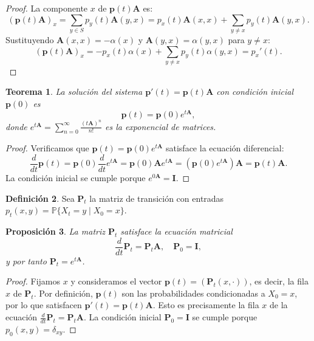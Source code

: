 \documentclass{article}
\theoremstyle{plain}
\newtheorem{Teorema}{Teorema}[section]
\newtheorem{Proposicion}[Teorema]{Proposici\'on}
\theoremstyle{definition}
\newtheorem{Definicion}[Teorema]{Definici\'on}
\newcommand{\Prob}{\mathbb{P}}
\newcommand{\A}{\mathbf{A}}
\newcommand{\I}{\mathbf{I}}
\newcommand{\p}{\mathbf{p}}
\newcommand{\PP}{\mathbf{P}}
\begin{document}
\begin{proof}
  La componente $x$ de $\p(t)\A$ es:
  \[ (\p(t)\A)_x = \sum_{y \in S} p_y(t) \A(y,x) = p_x(t)\A(x,x) + \sum_{y \neq x} p_y(t) \A(y,x). \]
  Sustituyendo $\A(x,x) = -\alpha(x)$ y $\A(y,x) = \alpha(y,x)$ para $y \neq x$:
  \[ (\p(t)\A)_x = -p_x(t)\alpha(x) + \sum_{y \neq x} p_y(t)\alpha(y,x) = p_x'(t). \]
\end{proof}

\begin{Teorema}
  La soluci\'on del sistema $\p'(t) = \p(t)\A$ con condici\'on inicial $\p(0)$ es
  \[ \p(t) = \p(0)e^{t\A}, \]
  donde $e^{t\A} = \sum_{n=0}^\infty \frac{(t\A)^n}{n!}$ es la exponencial de matrices.
\end{Teorema}

\begin{proof}
  Verificamos que $\p(t) = \p(0)e^{t\A}$ satisface la ecuaci\'on diferencial:
  \[ \frac{d}{dt} \p(t) = \p(0) \frac{d}{dt} e^{t\A} = \p(0) \A e^{t\A} = (\p(0)e^{t\A}) \A = \p(t) \A. \]
  La condici\'on inicial se cumple porque $e^{0\A} = \I$.
\end{proof}

\begin{Definicion}
  Sea $\PP_t$ la matriz de transici\'on con entradas $p_t(x,y) = \Prob\{X_t = y \mid X_0 = x\}$.
\end{Definicion}

\begin{Proposicion}
  La matriz $\PP_t$ satisface la ecuaci\'on matricial
  \[ \frac{d}{dt} \PP_t = \PP_t \A, \quad \PP_0 = \I, \]
  y por tanto $\PP_t = e^{t\A}$.
\end{Proposicion}

\begin{proof}
  Fijamos $x$ y consideramos el vector $\p(t) = (\PP_t(x,\cdot))$, es decir, la fila $x$ de $\PP_t$. Por definici\'on, $\p(t)$ son las probabilidades condicionadas a $X_0 = x$, por lo que satisfacen $\p'(t) = \p(t)\A$. Esto es precisamente la fila $x$ de la ecuaci\'on $\frac{d}{dt}\PP_t = \PP_t\A$. La condici\'on inicial $\PP_0 = \I$ se cumple porque $p_0(x,y) = \delta_{xy}$.
\end{proof}
\end{document}
